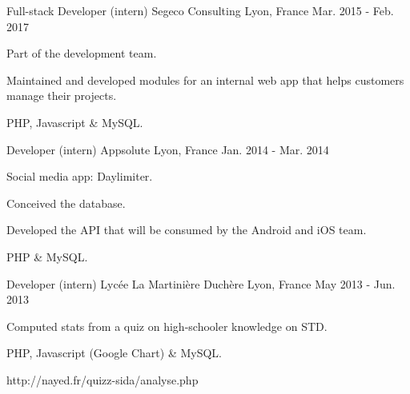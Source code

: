 

\begin{cventries}

  \cventry
  {Full-stack Developer (intern)} %
  {Segeco Consulting} %
  {Lyon, France} %
  {Mar. 2015 - Feb. 2017} %
    {
      \begin{cvitems} %
      \item {Part of the development team.}
      \item {Maintained and developed modules for an internal web app that helps customers manage their projects.}
      \item {PHP, Javascript \& MySQL.}
      \end{cvitems}
    }

  \cventry
  {Developer (intern)} %
  {Appsolute} %
  {Lyon, France} %
  {Jan. 2014 - Mar. 2014} %
    {
      \begin{cvitems} %
      \item {Social media app: Daylimiter.}
      \item {Conceived the database.}
      \item {Developed the API that will be consumed by the Android and iOS team.}
      \item {PHP \& MySQL.}
      \end{cvitems}
    }

  \cventry
  {Developer (intern)} %
  {Lycée La Martinière Duchère} %
  {Lyon, France} %
  {May 2013 - Jun. 2013} %
    {
      \begin{cvitems} %
      \item {Computed stats from a quiz on high-schooler knowledge on STD.}
      \item {PHP, Javascript (Google Chart) \& MySQL.}
      \item {http://nayed.fr/quizz-sida/analyse.php}
      \end{cvitems}
    }


\end{cventries}
